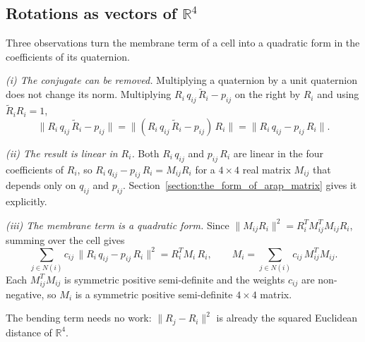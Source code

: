 \documentclass{birkjour}
\theoremstyle{remark}
\numberwithin{equation}{section}
\begin{document}
\subsection{Rotations as vectors of $\mathbb R^4$}
\label{section:linearization}

Three observations turn the membrane term of a cell into a quadratic form in the coefficients of its quaternion.

\emph{(i) The conjugate can be removed.} Multiplying a quaternion by a unit quaternion does not change its norm. Multiplying $R_i \, q_{ij} \, \tilde R_i - p_{ij}$ on the right by $R_i$ and using $\tilde R_i R_i = 1$,
\begin{equation*}
\| R_i \, q_{ij} \, \tilde R_i - p_{ij} \| = \| (R_i \, q_{ij} \, \tilde R_i - p_{ij}) \, R_i \| = \| R_i \, q_{ij} - p_{ij} \, R_i \| .
\end{equation*}

\emph{(ii) The result is linear in $R_i$.} Both $R_i \, q_{ij}$ and $p_{ij} \, R_i$ are linear in the four coefficients of $R_i$, so $R_i \, q_{ij} - p_{ij} \, R_i = M_{ij} R_i$ for a $4 \times 4$ real matrix $M_{ij}$ that depends only on $q_{ij}$ and $p_{ij}$. Section~\ref{section:the_form_of_arap_matrix} gives it explicitly.

\emph{(iii) The membrane term is a quadratic form.} Since $\| M_{ij} R_i \|^2 = R_i^T M_{ij}^T M_{ij} R_i$, summing over the cell gives
\begin{equation}
\label{eq:membrane_quadratic}
\sum_{j \in N(i)} c_{ij} \, \| R_i \, q_{ij} - p_{ij} \, R_i \|^2 = R_i^T M_i \, R_i, \qquad M_i = \sum_{j \in N(i)} c_{ij} \, M_{ij}^T M_{ij}.
\end{equation}
Each $M_{ij}^T M_{ij}$ is symmetric positive semi-definite and the weights $c_{ij}$ are non-negative, so $M_i$ is a symmetric positive semi-definite $4 \times 4$ matrix.

The bending term needs no work: $\| R_j - R_i \|^2$ is already the squared Euclidean distance of $\mathbb R^4$.
\end{document}
